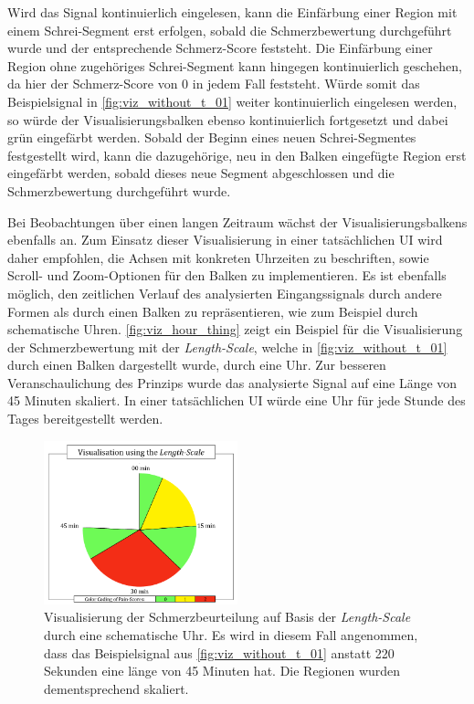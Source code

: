 Wird das Signal kontinuierlich eingelesen, kann die Einfärbung einer Region mit einem Schrei-Segment erst erfolgen, sobald die Schmerzbewertung durchgeführt wurde und der entsprechende Schmerz-Score feststeht. Die Einfärbung einer Region ohne zugehöriges Schrei-Segment kann hingegen kontinuierlich geschehen, da hier der Schmerz-Score von 0 in jedem Fall feststeht. Würde somit das Beispielsignal in \autoref{fig:viz_without_t_01} weiter kontinuierlich eingelesen werden, so würde der Visualisierungsbalken ebenso kontinuierlich fortgesetzt und dabei grün eingefärbt werden. Sobald der Beginn eines neuen Schrei-Segmentes festgestellt wird, kann die dazugehörige, neu in den Balken eingefügte Region erst eingefärbt werden, sobald dieses neue Segment abgeschlossen und die Schmerzbewertung durchgeführt wurde.

Bei Beobachtungen über einen langen Zeitraum wächst der Visualisierungsbalkens ebenfalls an. Zum Einsatz dieser Visualisierung in einer tatsächlichen UI wird daher empfohlen, die Achsen mit konkreten Uhrzeiten zu beschriften, sowie Scroll- und Zoom-Optionen für den Balken zu implementieren. Es ist ebenfalls möglich, den zeitlichen Verlauf des analysierten Eingangssignals durch andere Formen als durch einen Balken zu repräsentieren, wie zum Beispiel durch schematische Uhren. \autoref{fig:viz_hour_thing} zeigt ein Beispiel für die Visualisierung der Schmerzbewertung mit der \emph{Length-Scale}, welche in \autoref{fig:viz_without_t_01} durch einen Balken dargestellt wurde, durch eine Uhr. Zur besseren Veranschaulichung des Prinzips wurde das analysierte Signal auf eine Länge von 45 Minuten skaliert. In einer tatsächlichen UI würde eine Uhr für jede Stunde des Tages bereitgestellt werden.

\begin{figure}[h]
	\centering
	\includegraphics[width=0.5\textwidth]{bilder/visualisation_hour_02.png}
	\caption[Visualisierung der Schmerzbeurteilung durch eine schematische Uhr]{Visualisierung der Schmerzbeurteilung auf Basis der \emph{Length-Scale} durch eine schematische Uhr. Es wird in diesem Fall angenommen, dass das Beispielsignal aus \autoref{fig:viz_without_t_01} anstatt 220 Sekunden eine länge von 45 Minuten hat. Die Regionen wurden dementsprechend skaliert.}
	\label{fig:viz_hour_thing}
\end{figure}

